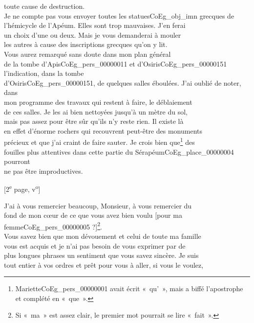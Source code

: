 \documentclass{book}
\begin{document}
toute cause de destruction.\\
\indent Je ne compte pas vous envoyer toutes les statues\gls{CoEg_obj_imn} grecques de\\
l’hémicycle de l’Apéum. Elles sont trop mauvaises. J’en ferai\\
un choix d’une ou deux. Mais je vous demanderai à mouler\\
les autres à cause des inscriptions grecques qu’on y lit.\\
\indent Vous aurez remarqué sans doute dans mon plan général\\
de la tombe d’Apis\gls{CoEg_pers_00000011} et d’Osiris\gls{CoEg_pers_00000151} l’indication, dans la tombe\\
d’Osiris\gls{CoEg_pers_00000151}, de quelques salles éboulées. J’ai oublié de noter, dans\\
mon programme des travaux qui restent à faire, le déblaiement\\
de ces salles. Je les ai bien nettoyées jusqu’à un mètre du sol,\\
mais pas assez pour être sûr qu’ils n’y reste rien. Il existe là\\
en effet d’énorme rochers qui recouvrent peut-être des monuments\\
précieux et que j’ai craint de faire sauter. Je crois bien que\footnote{Mariette\gls{CoEg_pers_00000001} avait écrit «~qu'~», mais a biffé l'apostrophe et complété en «~que~».} des\\
fouilles plus attentives dans cette partie du Sérapéum\gls{CoEg_place_00000004} pourront\\
ne pas être improductives.
{\footnotesize \begin{center} {[2\textsuperscript{e} page, v\textsuperscript{o}]}\end{center}}
\indent J’ai à vous remercier beaucoup, Monsieur, à vous remercier du\\
fond de mon cœur de ce que vous avez bien voulu [pour ma femme\gls{CoEg_pers_00000005} ?]\footnote{Si «~ma~» est assez clair, le premier mot pourrait se lire «~fait~».}.\\
Vous savez bien que mon dévouement et celui de toute ma famille\\
vous est acquis et je n’ai pas besoin de vous exprimer par de\\
plus longues phrases un sentiment que vous savez sincère. Je suis\\
tout entier à vos ordres et prêt pour vous à aller, si vous le voulez,\\
\end{document}
